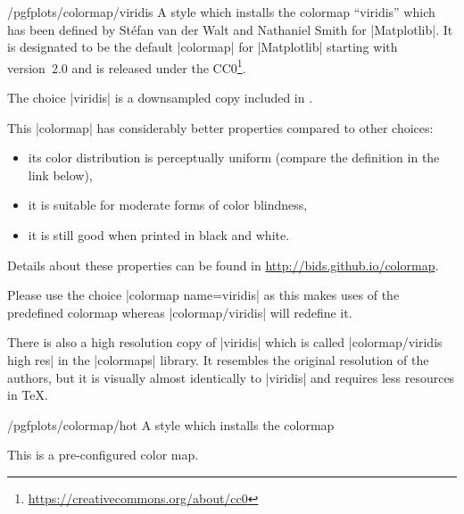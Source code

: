 \begin{stylekey}{/pgfplots/colormap/viridis}
    A style which installs the colormap ``viridis'' which has been defined by
    St\'efan van der Walt and Nathaniel Smith for |Matplotlib|. It is
    designated to be the default |colormap| for |Matplotlib| starting with
    version~2.0 and is released under the
    CC0\footnote{\url{https://creativecommons.org/about/cc0}}.

    The choice |viridis| is a downsampled copy included in \PGFPlots{}.

\begin{codeexample}
\pgfplotsset{
    colormap name=viridis,
}
\end{codeexample}

    This |colormap| has considerably better properties compared to other choices:
    \begin{itemize}
        \item its color distribution is perceptually uniform (compare the
            definition in the link below),
        \item it is suitable for moderate forms of color blindness,
        \item it is still good when printed in black and white.
    \end{itemize}
    Details about these properties can be found in
    \url{http://bids.github.io/colormap}.

    Please use the choice |colormap name=viridis| as this makes uses of the
    predefined colormap whereas |colormap/viridis| will redefine it.

    There is also a high resolution copy of |viridis| which is called
    |colormap/viridis high res| in the |colormaps| library. It resembles the
    original resolution of the authors, but it is visually almost identically
    to |viridis| and requires less resources in \TeX{}.
\end{stylekey}

\begin{stylekey}{/pgfplots/colormap/hot}
    A style which installs the colormap
\begin{codeexample}
\end{codeexample}


    This is a pre-configured color map.
\end{stylekey}

